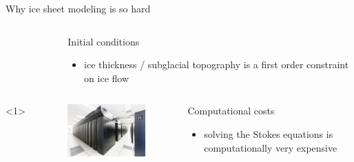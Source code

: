 \documentclass[hide notes,intlimits]{beamer}
\begin{document}
\begin{frame}{Why ice sheet modeling is so hard}
\begin{columns}[c]
\begin{column}{.28\linewidth}
\begin{figure}
        \end{figure}
      \end{column}
      \begin{column}{.67\linewidth}
        \begin{block}{Initial conditions}
        \begin{itemize}
        \item ice thickness / subglacial topography is a first order constraint on ice flow
        \end{itemize}
      \end{block}
      \end{column}
    \end{columns}
    \begin{columns}[c]<1>
      \begin{column}{.3\linewidth}
        \begin{figure}
          \includegraphics[width=\linewidth]{bw_front_sm}
        \end{figure}
      \end{column}
      \begin{column}{.67\linewidth}
        \begin{block}{Computational costs}
        \begin{itemize}
        \item solving the Stokes equations is computationally very expensive
        \end{itemize}
      \end{block}
      \end{column}
    \end{columns}
\end{frame}
\end{document}
